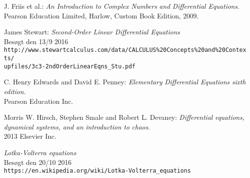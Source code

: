 \begin{thebibliography}{10}
J. Friis et al.: 
\textit{An Introduction to Complex Numbers and Differential Equations}. \\
Pearson Education Limited, Harlow, Custom Book Edition, 2009.

James Stewart:
\textit{Second-Order Linear Differential Equations} \\
Besøgt den 13/9 2016\\
\texttt{http://www.stewartcalculus.com/data/CALCULUS\%20Concepts\%20and\%20Contexts/\\upfiles/3c3-2ndOrderLinearEqns\_Stu.pdf}

C. Henry Edwards and David E. Penney: 
\textit{Elementary Differential Equations sixth edition}. \\
Pearson Education Inc.

Morris W. Hirsch, Stephen Smale and Robert L. Devaney: 
\textit{Differential equations, dynamical systems, and an introduction to chaos}. \\
2013 Elsevier Inc.

\textit{Lotka-Volterra equations} \\
Besøgt den 20/10 2016\\
\texttt{https://en.wikipedia.org/wiki/Lotka-Volterra\_equations}
\end{thebibliography}